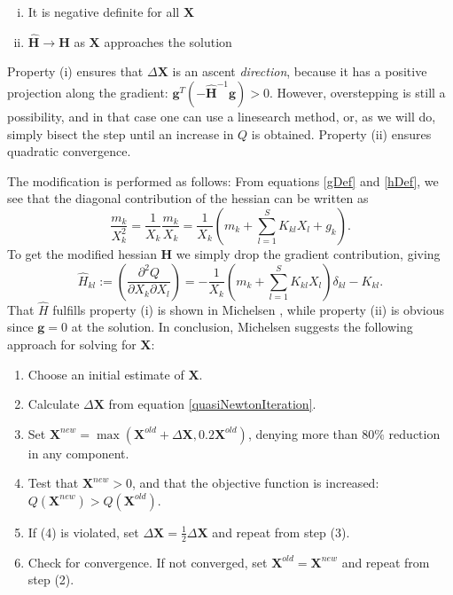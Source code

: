 \documentclass[english]{../thermomemo/thermomemo}
\newcommand{\mbf}[0]{\mathbf}
\newcommand*{\pdcross}[3]{\left(\frac{\partial^2 #1}{\partial #2 \partial #3}\right)}
\newcommand{\lp}{\left(}
\newcommand{\rp}{\right)}
\begin{document}
\begin{enumerate}[(i)]
\item It is negative definite for all $\mbf X$
\item $\mbf{\hat H} \to \mbf H$ as $\mbf X$ approaches the solution
\end{enumerate}
Property (i) ensures that $\Delta \mbf X$ is an ascent \textit{direction}, because it has a positive projection along the gradient: $\mbf g^T (-\mbf{\hat H}^{-1} \mbf g) > 0$. However, overstepping is still a possibility, and in that case one can use a linesearch method, or, as we will do, simply bisect the step until an increase in $Q$ is obtained. Property (ii) ensures quadratic convergence.

The modification is performed as follows: From equations \eqref{gDef} and \eqref{hDef}, we see that the diagonal contribution of the hessian can be written as
$$
\frac{m_k}{X_k^2} = \frac{1}{X_k} \frac{m_k}{X_k} = \frac{1}{X_k} \lp m_k + \sum_{l=1}^S K_{kl} X_l + g_k \rp.
$$
To get the modified hessian $\mbf H$ we simply drop the gradient contribution, giving
\begin{equation}
  \hat H_{kl} := \pdcross{Q}{X_k}{X_l} = -\frac{1}{X_k} \lp m_k + \sum_{l=1}^S K_{kl} X_l \rp \delta_{kl} - K_{kl}.
\end{equation}
That $\hat H$ fulfills property (i) is shown in Michelsen \cite{Michelsen06}, while property (ii) is obvious since $\mbf g=0$ at the solution.
In conclusion, Michelsen \cite{Michelsen06} suggests the following approach for solving for $\mbf X$:
\begin{enumerate}[(1)]
\item Choose an initial estimate of $\mbf X$.
\item Calculate $\Delta \mbf X$ from equation \eqref{quasiNewtonIteration}.
\item Set $\mbf X^{new} = \max(\mbf X^{old} + \Delta \mbf X, 0.2 \mbf X^{old})$, denying more than $80 \%$ reduction in any component.
\item Test that $\mbf X^{new} > 0$, and that the objective function is increased: $Q(\mbf X^{new}) > Q(\mbf X^{old})$.
\item If (4) is violated, set $\Delta \mbf X = \tfrac{1}{2} \Delta \mbf X$ and repeat from step (3).
\item Check for convergence. If not converged, set $\mbf X^{old} = \mbf X^{new}$ and repeat from step (2).
\end{enumerate}
\end{document}
